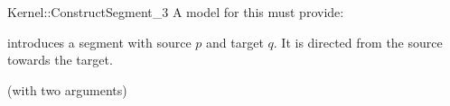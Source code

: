 \begin{ccRefFunctionObjectConcept}{Kernel::ConstructSegment_3}
A model for this must provide:


            {introduces a segment  with source $p$
             and target $q$. It is directed from the source towards
             the target.}


\ccRefines
{} (with two arguments)

\ccSeeAlso
{}\\

\end{ccRefFunctionObjectConcept}
